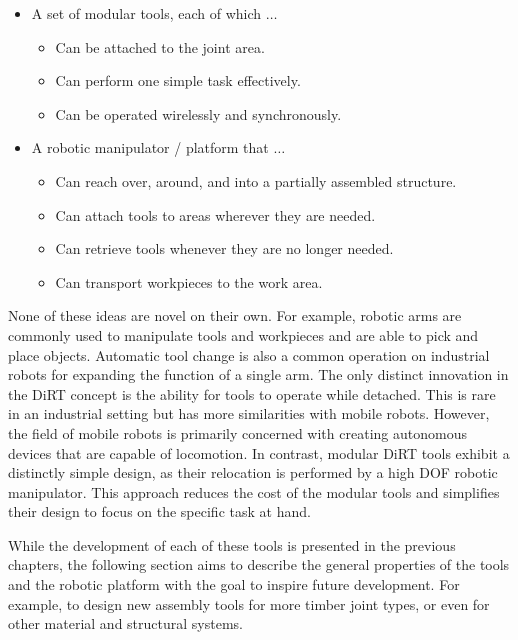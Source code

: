 \documentclass[11pt]{book}
\begin{document}
\begin{itemize}
	\item A set of modular tools, each of which $\ldots$

\begin{itemize}
	\item Can be attached to the joint area.

	\item Can perform one simple task effectively.

	\item Can be operated wirelessly and synchronously.

\end{itemize}
	\item A robotic manipulator / platform that $\ldots$ 

\begin{itemize}
	\item Can reach over, around, and into a partially assembled structure.

	\item Can attach tools to areas wherever they are needed.

	\item Can retrieve tools whenever they are no longer needed.

	\item Can transport workpieces to the work area.

\end{itemize}
\end{itemize}
None of these ideas are novel on their own. For example, robotic arms are commonly used to manipulate tools and workpieces and are able to pick and place objects. Automatic tool change is also a common operation on industrial robots for expanding the function of a single arm. The only distinct innovation in the DiRT concept is the ability for tools to operate while detached. This is rare in an industrial setting but has more similarities with mobile robots. However, the field of mobile robots is primarily concerned with creating autonomous devices that are capable of locomotion. In contrast, modular DiRT tools exhibit a distinctly simple design, as their relocation is performed by a high DOF robotic manipulator. This approach reduces the cost of the modular tools and simplifies their design to focus on the specific task at hand. 

While the development of each of these tools is presented in the previous chapters, the following section aims to describe the general properties of the tools and the robotic platform with the goal to inspire future development. For example, to design new assembly tools for more timber joint types, or even for other material and structural systems.
\end{document}
